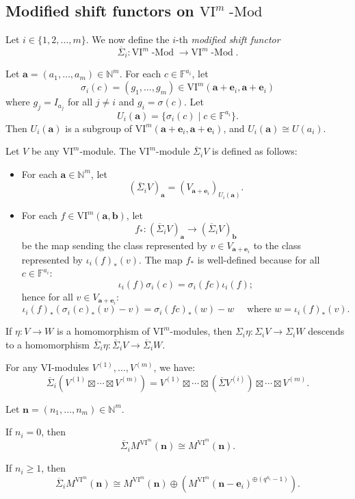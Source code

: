 \documentclass{amsart}
\numberwithin{equation}{section}
\DeclareMathOperator{\Mod}{-Mod}
\newcommand{\N}{{\mathbb{N}}}
\newcommand{\F}{{\mathbb{F}}}
\newcommand{\VI}{{\mathrm{VI}}}
\newcommand{\SSigma}{{\overline{\Sigma}}}
\begin{document}
\subsection{Modified shift functors on $\VI^m\Mod$}
Let $i\in \{1, 2, \ldots, m\}$. We now define the $i$-th \emph{modified shift functor} 
\[ \SSigma_i : \VI^m\Mod \to \VI^m\Mod. \]

Let $\mathbf{a} = (a_1, \ldots, a_m)\in \N^m$. For each $c\in \F^{a_i}$, let 
\[ \sigma_i(c) = (g_1, \ldots, g_m) \in \VI^m(\mathbf{a}+\mathbf{e}_i, \mathbf{a}+\mathbf{e}_i) \]
where $g_j = I_{a_j}$ for all $j\neq i$ and $g_i = \sigma(c)$. Let 
\[ U_i(\mathbf{a}) = \{ \sigma_i(c) \mid c\in \F^{a_i} \}. \] 
Then $U_i(\mathbf{a})$ is a subgroup of $\VI^m(\mathbf{a}+\mathbf{e}_i, \mathbf{a}+\mathbf{e}_i)$, and $U_i(\mathbf{a})\cong U(a_i)$.

Let $V$ be any $\VI^m$-module. The $\VI^m$-module $\SSigma_i V$ is defined as follows:
\begin{itemize}
   \item For each $\mathbf{a}\in \N^m$, let
   \[ (\SSigma_i V)_{\mathbf{a}} = (V_{\mathbf{a}+\mathbf{e}_i})_{U_i(\mathbf{a})}. \]

   \item For each $f\in \VI^m(\mathbf{a},\mathbf{b})$, let  
   \[ f_* : (\SSigma_i V)_{\mathbf{a}} \to (\SSigma_i V)_{\mathbf{b}} \]
   be the map sending the class represented by $v\in V_{\mathbf{a}+\mathbf{e}_i}$ to the class represented by $\iota_i(f)_*(v)$. The map $f_*$ is well-defined because for all $c\in \F^{a_i}$:   
   \[ \iota_i(f)\sigma_i(c) = \sigma_i(fc)\iota_i(f); \]
   hence for all $v\in V_{\mathbf{a}+\mathbf{e}_i}$:
   \[ \iota_i(f)_*(\sigma_i(c)_*(v) - v) =  \sigma_i(fc)_*(w) - w \quad \mbox{ where } w= \iota_i(f)_*(v). \]
\end{itemize} 

If $\eta: V\to W$ is a homomorphism of $\VI^m$-modules, then $\Sigma_i\eta: \Sigma_i V\to \Sigma_i W$ descends to a homomorphism $\SSigma_i\eta: \SSigma_i V\to \SSigma_i W$.


For any $\VI$-modules $V^{(1)}, \ldots, V^{(m)}$, we have:
\begin{equation}\label{eq: tensor_i}
\SSigma_i\left( V^{(1)}\boxtimes \cdots\boxtimes V^{(m)} \right) 
= V^{(1)}\boxtimes \cdots \boxtimes \left( \SSigma V^{(i)} \right) \boxtimes \cdots\boxtimes V^{(m)}. 
\end{equation}


\begin{proposition} \label{prop:barshift2}
   Let $\mathbf{n}=(n_1, \ldots, n_m)\in \N^m$. 

   If $n_i=0$, then 
   \[ \SSigma_i M^{\VI^m}(\mathbf{n}) \cong M^{\VI^m}(\mathbf{n}). \]

   If $n_i\geqslant 1$, then 
   \[ \SSigma_i M^{\VI^m}(\mathbf{n}) \cong M^{\VI^m}(\mathbf{n}) \oplus \left( M^{\VI^m}(\mathbf{n}-\mathbf{e}_i)^{\oplus (q^{n_i}-1)} \right). \]
\end{proposition}
\end{document}
